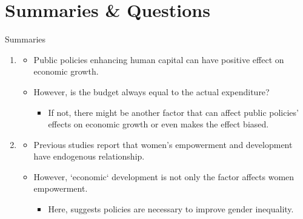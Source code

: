 \documentclass[xcolor=dvipsnames, t]{beamer}
\begin{document}
	\section{Summaries \& Questions}
	\begin{frame}[fragile]{Summaries}
		\begin{enumerate}
			\item \citet{king:rebelo:1990} \pause
			\begin{itemize}
				\item Public policies enhancing human capital can have positive effect on economic growth.
				\item However, is the budget always equal to the actual expenditure? \pause
				\begin{itemize}
					\item If not, there might be another factor that can affect public policies' effects on economic growth or even makes the effect biased. \pause
				\end{itemize} 
			\end{itemize}
			\item \citet{duflo:2012} \pause
			\begin{itemize}
				\item Previous studies report that women's empowerment and development have endogenous relationship. \pause
				\item However, `economic` development is not only the factor affects women empowerment. \pause
				\begin{itemize}
					\item Here, \citet{duflo:2012} suggests policies are necessary to improve gender inequality.
				\end{itemize}
			\end{itemize}
		\end{enumerate}
	\end{frame}
	
\end{document}
